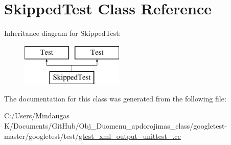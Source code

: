 \hypertarget{class_skipped_test}{}\section{Skipped\+Test Class Reference}
\label{class_skipped_test}
Inheritance diagram for Skipped\+Test\+:\begin{figure}[H]
\begin{center}
\leavevmode
\includegraphics[height=2.000000cm]{dc/d0f/class_skipped_test}
\end{center}
\end{figure}


The documentation for this class was generated from the following file\+:\begin{DoxyCompactItemize}
\item 
C\+:/\+Users/\+Mindaugas K/\+Documents/\+Git\+Hub/\+Obj\+\_\+\+Duomenu\+\_\+apdorojimas\+\_\+class/googletest-\/master/googletest/test/\mbox{\hyperlink{googletest-master_2googletest_2test_2gtest__xml__output__unittest___8cc}{gtest\+\_\+xml\+\_\+output\+\_\+unittest\+\_\+.\+cc}}\end{DoxyCompactItemize}
